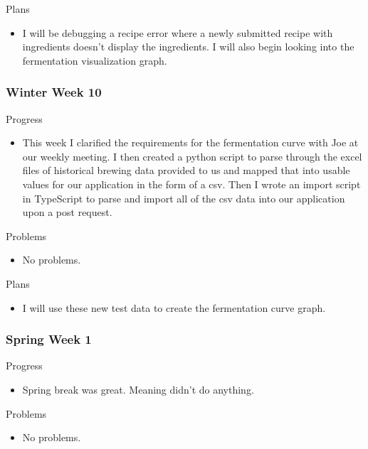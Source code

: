         \noindent
        Plans
        \begin{itemize}
            \item I will be debugging a recipe error where a newly submitted recipe with ingredients doesn’t display the ingredients.  I will also begin looking into the fermentation visualization graph.
        \end{itemize}
        
    \subsubsection{Winter Week 10}
    
        \noindent
        Progress
        \begin{itemize}
            \item This week I clarified the requirements for the fermentation curve with Joe at our weekly meeting.  I then created a python script to parse through the excel files of historical brewing data provided to us and mapped that into usable values for our application in the form of a csv.  Then I wrote an import script in TypeScript to parse and import all of the csv data into our application upon a post request.
        \end{itemize}
        
        \noindent
        Problems
        \begin{itemize}
            \item No problems.
        \end{itemize}
        
        \noindent
        Plans
        \begin{itemize}
            \item I will use these new test data to create the fermentation curve graph.
        \end{itemize}
        
    \subsubsection{Spring Week 1}
    
        \noindent
        Progress
        \begin{itemize}
            \item Spring break was great.  Meaning didn’t do anything.
        \end{itemize}
        
        \noindent
        Problems
        \begin{itemize}
            \item No problems.
        \end{itemize}
        
